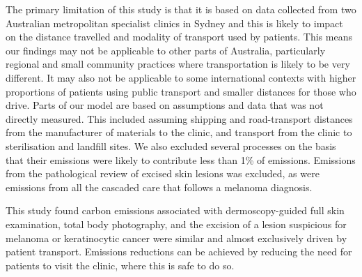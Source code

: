 \begin{refsection}
The primary limitation of this study is that it is based on data collected from two Australian metropolitan specialist clinics in Sydney and this is likely to impact on the distance travelled and modality of transport used by patients. This means our findings may not be applicable to other parts of Australia, particularly regional and small community practices where transportation is likely to be very different. It may also not be applicable to some international contexts with higher proportions of patients using public transport and smaller distances for those who drive. Parts of our model are based on assumptions and data that was not directly measured. This included assuming shipping and road-transport distances from the manufacturer of materials to the clinic, and transport from the clinic to sterilisation and landfill sites. We also excluded several processes on the basis that their emissions were likely to contribute less than 1\% of emissions. Emissions from the pathological review of excised skin lesions was excluded, as were emissions from all the cascaded care that follows a melanoma diagnosis.

This study found carbon emissions associated with dermoscopy-guided full skin examination, total body photography, and the excision of a lesion suspicious for melanoma or keratinocytic cancer were similar and almost exclusively driven by patient transport. Emissions reductions can be achieved by reducing the need for patients to visit the clinic, where this is safe to do so.


\printbibliography[heading=subbibliography]
\end{refsection}
